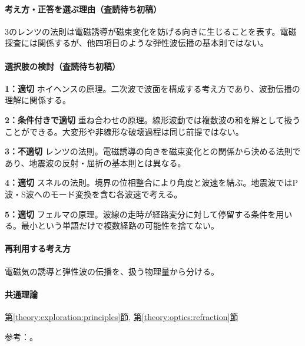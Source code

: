 \paragraph{考え方・正答を選ぶ理由（査読待ち初稿）} 3のレンツの法則は電磁誘導が磁束変化を妨げる向きに生じることを表す。電磁探査には関係するが、他四項目のような弾性波伝播の基本則ではない。

\paragraph{選択肢の検討（査読待ち初稿）}\mbox{}\par

\noindent\textbf{1：適切} ホイヘンスの原理。二次波で波面を構成する考え方であり、波動伝播の理解に関係する。\par

\noindent\textbf{2：条件付きで適切} 重ね合わせの原理。線形波動では複数波の和を解として扱うことができる。大変形や非線形な破壊過程は同じ前提ではない。\par

\noindent\textbf{3：不適切} レンツの法則。電磁誘導の向きを磁束変化との関係から決める法則であり、地震波の反射・屈折の基本則とは異なる。\par

\noindent\textbf{4：適切} スネルの法則。境界の位相整合により角度と波速を結ぶ。地震波ではP波・S波へのモード変換を含む各波速で考える。\par

\noindent\textbf{5：適切} フェルマの原理。波線の走時が経路変分に対して停留する条件を用いる。最小という単語だけで複数経路の可能性を捨てない。\par

\paragraph{再利用する考え方} 電磁気の誘導と弾性波の伝播を、扱う物理量から分ける。

\paragraph{共通理論} \hyperref[theory:exploration:principles]{第\ref*{theory:exploration:principles}節}, \hyperref[theory:optics:refraction]{第\ref*{theory:optics:refraction}節}

\par 参考：\cite{mit_signals2010,stanford_downward2001,epa_seismic_reflection}。

